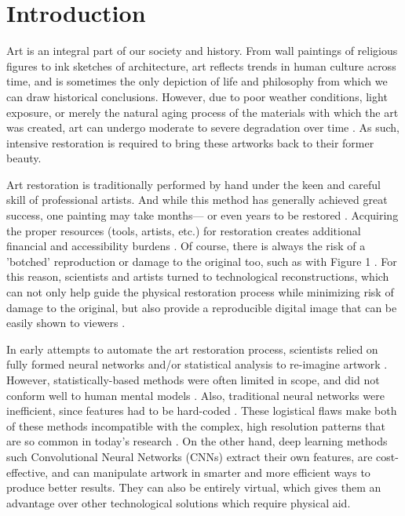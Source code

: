 \documentclass[a4paper,11pt]{article}
\begin{document}
\section{Introduction}
 
Art is an integral part of our society and history. From wall paintings of religious figures to ink sketches of architecture, art reflects trends in human culture across time, and is sometimes the only depiction of life and philosophy from which we can draw historical conclusions. However, due to poor weather conditions, light exposure, or merely the natural aging process of the materials with which the art was created, art can undergo moderate to severe degradation over time \cite{barni2005}\cite{gupta}\cite{amiri}. As such, intensive restoration is required to bring these artworks back to their former beauty.

Art restoration is traditionally performed by hand under the keen and careful skill of professional artists. And while this method has generally achieved great success, one painting may take months— or even years to be restored \cite{amiri}. Acquiring the proper resources (tools, artists, etc.) for restoration creates additional financial and accessibility burdens \cite{barni2000}. Of course, there is always the risk of a 'botched' reproduction or damage to the original too, such as with Figure 1 \cite{jesus}. For this reason, scientists and artists turned to technological reconstructions, which can not only help guide the physical restoration process while minimizing risk of damage to the original, but also provide a reproducible digital image that can be easily shown to viewers \cite{barni2005}.

In early attempts to automate the art restoration process, scientists relied on fully formed neural networks and/or statistical analysis to re-imagine artwork \cite{barni2000}\cite{palomero}\cite{giakoumis}\cite{spagnolo}. However, statistically-based methods were often limited in scope, and did not conform well to human mental models \cite{gupta}. Also, traditional neural networks were inefficient, since features had to be hard-coded \cite{sizyakin}. These logistical flaws make both of these methods incompatible with the complex, high resolution patterns that are so common in today's research \cite{sizyakin}. On the other hand, deep learning methods such Convolutional Neural Networks (CNNs) extract their own features, are cost-effective, and can manipulate artwork in smarter and more efficient ways to produce better results. They can also be entirely virtual, which gives them an advantage over other technological solutions which require physical aid.  
\end{document}
